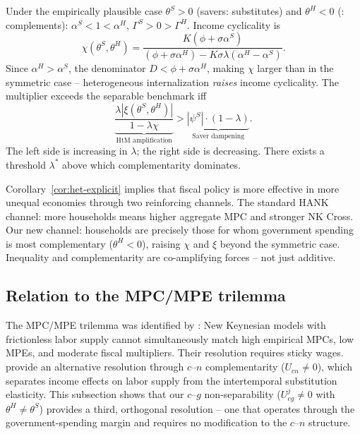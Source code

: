 \begin{corollary}\label{cor:het-explicit}
Under the empirically plausible case $\theta^{S}>0$ (savers: substitutes) and
$\theta^{H}<0$ (\HtM: complements): $\alpha^{S}<1<\alpha^{H}$,
$\Gamma^{S}>0>\Gamma^{H}$. Income cyclicality is
\begin{equation}
  \chi(\theta^{S},\theta^{H})=
  \frac{K(\phi+\sigma\alpha^{S})}
       {(\phi+\sigma\alpha^{H})-K\sigma\lambda(\alpha^{H}-\alpha^{S})}.
\end{equation}
Since $\alpha^{H}>\alpha^{S}$, the denominator $D<\phi+\sigma\alpha^{H}$,
making $\chi$ larger than in the symmetric case -- heterogeneous internalization
\emph{raises} income cyclicality. The multiplier exceeds the separable
benchmark iff
\begin{equation}\label{eq:dom-threshold}
  \underbrace{\frac{\lambda|\xi(\theta^{S},\theta^{H})|}{1-\lambda\chi}}_{\text{HtM amplification}}
  >\underbrace{|\psi^{S}|\cdot(1-\lambda)}_{\text{Saver dampening}}.
\end{equation}
The left side is increasing in $\lambda$; the right side is decreasing. There
exists a threshold $\lambda^{*}$ above which complementarity dominates.
\end{corollary}

\begin{remark}\label{rem:ineq-amp}
Corollary~\ref{cor:het-explicit} implies that fiscal policy is more effective
in more unequal economies through two reinforcing channels. The standard HANK
channel: more \HtM{} households means higher aggregate MPC and stronger NK
Cross. Our new channel: \HtM{} households are precisely those for whom
government spending is most complementary ($\theta^{H}<0$), raising $\chi$
and $\xi$ beyond the symmetric case. Inequality and complementarity are
co-amplifying forces -- not just additive.
\end{remark}

\subsection{Relation to the MPC/MPE trilemma}\label{subsec:trilemma}

The MPC/MPE trilemma was identified by \citet{Auclert2024}: New Keynesian
models with frictionless labor supply cannot simultaneously match high
empirical MPCs, low MPEs, and moderate fiscal multipliers. Their resolution
requires sticky wages. \BHL{} provide an alternative resolution through $c$--$n$
complementarity ($U_{cn}\neq 0$), which separates income effects on labor
supply from the intertemporal substitution elasticity. This subsection shows
that our $c$--$g$ non-separability ($U_{cg}^{j}\neq 0$ with
$\theta^{H}\neq\theta^{S}$) provides a third, orthogonal resolution -- one that
operates through the government-spending margin and requires no modification
to the $c$--$n$ structure.

